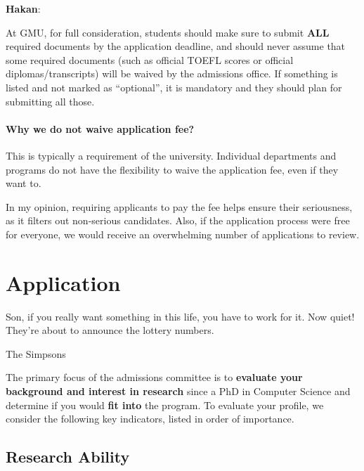\documentclass[11pt]{article}
\newenvironment{commentbox}[1][]{
\small
    \begin{cbox}
    \textbf{#1}: 
 }{
   \end{cbox}
}
\begin{document}
\begin{commentbox}[Hakan]
At GMU, for full consideration, students should make sure to submit \textbf{ALL} required documents by the application deadline, and should never assume that some required documents (such as official TOEFL scores or official diplomas/transcripts) will be waived by the admissions office. If something is listed and not marked as ``optional'', it is mandatory and they should plan for submitting all those.  
\end{commentbox}
\paragraph{Why we do not waive application fee?}  This is typically a requirement of the university. Individual departments and programs do not have the flexibility to waive the application fee, even if they want to. 

In my opinion, requiring applicants to pay the fee helps ensure their seriousness, as it filters out non-serious candidates. Also, if the application process were free for everyone, we would receive an overwhelming number of applications to review.




\section{Application}\label{sec:application}

\epigraph{Son, if you really want something in this life, you have to work for it. Now quiet! They’re about to announce the lottery numbers.}{The Simpsons}


The primary focus of the admissions committee is to \textbf{evaluate your background and interest in research} since a PhD in Computer Science and determine if you would \textbf{fit into} the program. To evaluate your profile, we consider
the following key indicators, listed in order of importance.

\subsection{Research Ability}
\end{document}
